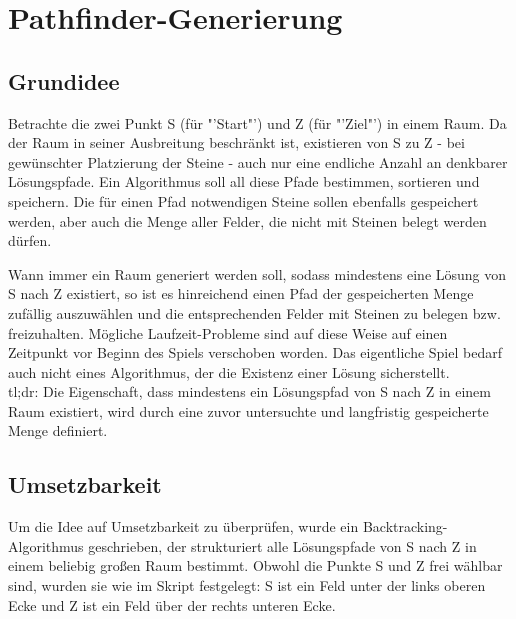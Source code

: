 \documentclass[a4paper,10pt,ngerman]{scrartcl}
\title{\Aufgabe}
\author{\Name}
\date{\today}
\begin{document}
	
	\maketitle
	\tableofcontents
	
	
	\section{Pathfinder-Generierung}
		
		\subsection{Grundidee}
		
			Betrachte die zwei Punkt S (für "'Start"') und Z (für "'Ziel"') in einem Raum. Da der Raum in seiner Ausbreitung beschränkt ist, existieren von S zu Z - bei gewünschter Platzierung der Steine - auch nur eine endliche Anzahl an denkbarer Lösungspfade. Ein Algorithmus soll all diese Pfade bestimmen, sortieren und speichern. Die für einen Pfad notwendigen Steine sollen ebenfalls gespeichert werden, aber auch die Menge aller Felder, die nicht mit Steinen belegt werden dürfen.
			
			Wann immer ein Raum generiert werden soll, sodass mindestens eine Lösung von S nach Z existiert, so ist es hinreichend einen Pfad der gespeicherten Menge zufällig auszuwählen und die entsprechenden Felder mit Steinen zu belegen bzw. freizuhalten. Mögliche Laufzeit-Probleme sind auf diese Weise auf einen Zeitpunkt vor Beginn des Spiels verschoben worden. Das eigentliche Spiel bedarf auch nicht eines Algorithmus, der die Existenz einer Lösung sicherstellt.\\
			
			tl;dr: Die Eigenschaft, dass mindestens ein Lösungspfad von S nach Z in einem Raum existiert, wird durch eine zuvor untersuchte und langfristig gespeicherte Menge definiert.
		
		\subsection{Umsetzbarkeit}
		
			Um die Idee auf Umsetzbarkeit zu überprüfen, wurde ein Backtracking-Algorithmus geschrieben, der strukturiert alle Lösungspfade von S nach Z in einem beliebig großen Raum bestimmt. Obwohl die Punkte S und Z frei wählbar sind, wurden sie wie im Skript festgelegt: S ist ein Feld unter der links oberen Ecke und Z ist ein Feld über der rechts unteren Ecke.
			
\end{document}
